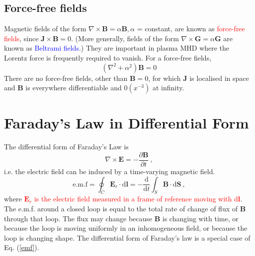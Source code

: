 \documentclass[12pt,a4paper]{article}
\renewcommand{\vec}[1]{\boldsymbol{#1}}
\newcommand{\dif}{\mathrm{d}}
\begin{document}
\subsection{Force-free fields}
Magnetic fields of the form $\nabla \times \vec{B} = \alpha \vec{B}, \alpha$ = constant, are known as \textcolor{red}{force-free fields}, since $\vec{J} \times \vec{B} = 0$. (More generally, fields of the form $\nabla \times  \vec{G} = \alpha \vec{G}$ are known as  \textcolor{blue}{Beltrami fields}.) They are important in plasma MHD where the Lorentz force is frequently required to vanish. For a force-free fields, 
\begin{equation}
(\nabla^2 +\alpha^2 ) \vec{B} = 0
\end{equation}
There are no force-free fields, other than $\vec{B} = 0$, for which $\vec{J}$ is localised in space and $\vec{B}$ is everywhere differentiable and $0(x^{-3})$ at infinity.

\section{Faraday's Law in Differential Form}
The differential form of Faraday's Law is 
\begin{equation}
\nabla \times \vec{E} = -\dfrac{\partial \vec{B}}{\partial t} ~,
\label{diff_Faradaylaw}
\end{equation}
i.e. the electric field can be induced by a time-varying magnetic field.
\begin{equation}
\text{e.m.f} = \oint_C \vec{E}_r \cdot \dif \vec{l} = -\frac{\dif }{\dif t} \int_S \vec{B} \cdot \dif \vec{S} ~,
\label{emf}
\end{equation}
where \textcolor{red}{$\vec{E}_r$ is the electric field measured in a frame of reference moving with $\dif \vec{l}$}. The e.m.f. around a closed loop is equal to the total rate of change of flux of $\vec{B}$ through that loop. The flux may change because $\vec{B}$ is changing with time, or because the loop is moving uniformly in an inhomogeneous field, or because the loop is changing shape. The differential form of Faraday's law is a special case of Eq. (\ref{emf}). 
\end{document}
